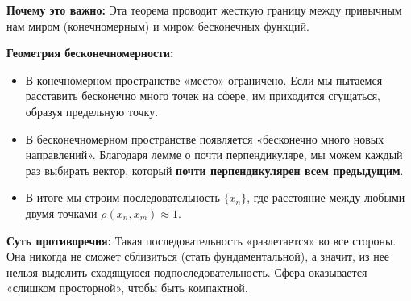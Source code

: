 \begin{idea}
	\textbf{Почему это важно:} Эта теорема проводит жесткую границу между привычным нам миром (конечномерным) и миром бесконечных функций. 
	
	\textbf{Геометрия бесконечномерности:}
	\begin{itemize}
		\item В конечномерном пространстве «место» ограничено. Если мы пытаемся расставить бесконечно много точек на сфере, им приходится сгущаться, образуя предельную точку.
		\item В бесконечномерном пространстве появляется «бесконечно много новых направлений». Благодаря лемме о почти перпендикуляре, мы можем каждый раз выбирать вектор, который \textbf{почти перпендикулярен всем предыдущим}.
		\item В итоге мы строим последовательность $\{x_n\}$, где расстояние между любыми двумя точками $\rho(x_n, x_m) \approx 1$. 
	\end{itemize}
	
	\textbf{Суть противоречия:} 
	Такая последовательность «разлетается» во все стороны. Она никогда не сможет сблизиться (стать фундаментальной), а значит, из нее нельзя выделить сходящуюся подпоследовательность. Сфера оказывается «слишком просторной», чтобы быть компактной.
\end{idea}